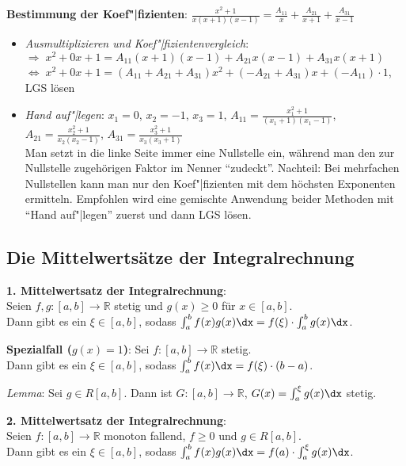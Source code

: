 \textbf{Bestimmung der Koef"|fizienten}:
$\frac{x^2 + 1}{x(x+1)(x-1)} = \frac{A_{11}}{x} + \frac{A_{21}}{x + 1} +
\frac{A_{31}}{x - 1}$
\begin{itemize}
   \item \emph{Ausmultiplizieren und Koef"|fizientenvergleich}: \\
   $\Rightarrow\; x^2 + 0x + 1 = A_{11}(x + 1)(x - 1) + A_{21}x(x - 1) +
   A_{31}x(x + 1)$ \\
   $\Leftrightarrow\; x^2 + 0x + 1 = (A_{11} + A_{21} + A_{31})x^2 +
   (-A_{21} + A_{31})x + (-A_{11}) \cdot 1$, \qquad
   LGS lösen

   \item \emph{Hand auf"|legen}:
   $x_1 = 0$, $x_2 = -1$, $x_3 = 1$,
   $A_{11} = \frac{x_1^2 + 1}{(x_1 + 1)(x_1 - 1)}$,
   $A_{21} = \frac{x_2^2 + 1}{x_2 (x_2 - 1)}$,
   $A_{31} = \frac{x_3^2 + 1}{x_3 (x_3 + 1)}$ \\
   Man setzt in die linke Seite immer eine Nullstelle ein, während
   man den zur Nullstelle zugehörigen Faktor im Nenner "`zudeckt"'.
   Nachteil: Bei mehrfachen Nullstellen kann man nur den Koef"|fizienten mit
   dem höchsten Exponenten ermitteln.
   Empfohlen wird eine gemischte Anwendung beider Methoden mit
   "`Hand auf"|legen"' zuerst und dann LGS lösen.
\end{itemize}

\subsection{%
    Die Mittelwertsätze der Integralrechnung%
}

\textbf{1. Mittelwertsatz der Integralrechnung}: \\
Seien $f, g: [a,b] \rightarrow \mathbb{R}$ stetig und $g(x) \ge 0$
für $x \in [a,b]$. \\
Dann gibt es ein $\xi \in [a,b]$, sodass
$\int_a^b f(x)g(x)\dx = f(\xi) \cdot \int_a^b g(x)\dx$.

\textbf{Spezialfall ($g(x) = 1$)}:
Sei $f: [a,b] \rightarrow \mathbb{R}$ stetig. \\
Dann gibt es ein $\xi \in [a,b]$, sodass
$\int_a^b f(x)\dx = f(\xi) \cdot (b-a)$.

\linie

\emph{Lemma}: Sei $g \in R[a,b]$.
Dann ist $G: [a,b] \rightarrow \mathbb{R}$, $G(x) = \int_a^\xi g(x)\dx$ stetig.

\textbf{2. Mittelwertsatz der Integralrechnung}: \\
Seien $f: [a,b] \rightarrow \mathbb{R}$ monoton fallend, $f \ge 0$
und $g \in R[a,b]$. \\
Dann gibt es ein $\xi \in [a,b]$, sodass
$\int_a^b f(x)g(x)\dx = f(a) \cdot \int_a^\xi g(x)\dx$.

